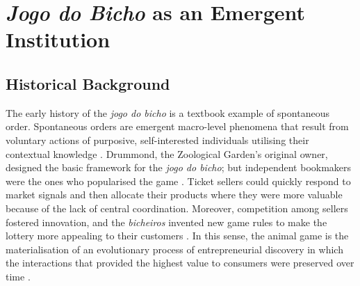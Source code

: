\section{\emph{Jogo do Bicho} as an Emergent Institution}
\label{sec:institution}

\subsection{Historical Background}
\label{sub:background}

The early history of the \emph{jogo do bicho} is a textbook example of spontaneous order. Spontaneous orders are emergent macro-level phenomena that result from voluntary actions of purposive, self-interested individuals utilising their contextual knowledge \citep{boettke1990theory, boettke2005methodological, hayek1945use, hayek1960constitution, hayek1973law, leeson2008coordination, menger1871grundsatze, polanyi1948planning, polanyi1951logic}. Drummond, the Zoological Garden's original owner, designed the basic framework for the \emph{jogo do bicho}; but independent bookmakers were the ones who popularised the game \citep[77]{magalhaes2005ganhou}. Ticket sellers could quickly respond to market signals and then allocate their products where they were more valuable because of the lack of central coordination. Moreover, competition among sellers fostered innovation, and the \emph{bicheiros} invented new game rules to make the lottery more appealing to their customers \citep[61]{mello1989historia}. In this sense, the animal game is the materialisation of an evolutionary process of entrepreneurial discovery in which the interactions that provided the highest value to consumers were preserved over time \citep{boettke2008gordon, boettke2014entrepreneurship, buchanan1964should, hayek1978competition, kirzner1997entrepreneurial}.

